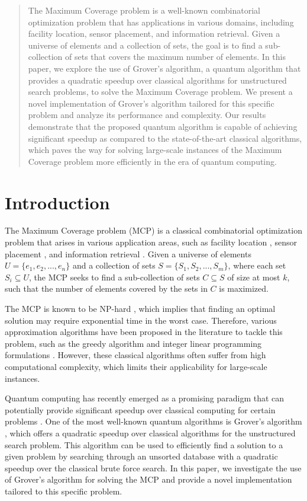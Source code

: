 \begin{abstract}
The Maximum Coverage problem is a well-known combinatorial optimization problem that has applications in various domains, including facility location, sensor placement, and information retrieval. Given a universe of elements and a collection of sets, the goal is to find a sub-collection of sets that covers the maximum number of elements. In this paper, we explore the use of Grover's algorithm, a quantum algorithm that provides a quadratic speedup over classical algorithms for unstructured search problems, to solve the Maximum Coverage problem. We present a novel implementation of Grover's algorithm tailored for this specific problem and analyze its performance and complexity. Our results demonstrate that the proposed quantum algorithm is capable of achieving significant speedup as compared to the state-of-the-art classical algorithms, which paves the way for solving large-scale instances of the Maximum Coverage problem more efficiently in the era of quantum computing.
\end{abstract}

\section{Introduction}

The Maximum Coverage problem (MCP) is a classical combinatorial optimization problem that arises in various application areas, such as facility location \cite{facility_location}, sensor placement \cite{sensor_placement}, and information retrieval \cite{information_retrieval}. Given a universe of elements $U = \{e_1, e_2, ..., e_n\}$ and a collection of sets $S = \{S_1, S_2, ..., S_m\}$, where each set $S_i \subseteq U$, the MCP seeks to find a sub-collection of sets $C \subseteq S$ of size at most $k$, such that the number of elements covered by the sets in $C$ is maximized.

The MCP is known to be NP-hard \cite{NP_hardness}, which implies that finding an optimal solution may require exponential time in the worst case. Therefore, various approximation algorithms have been proposed in the literature to tackle this problem, such as the greedy algorithm \cite{greedy_algorithm} and integer linear programming formulations \cite{integer_programming}. However, these classical algorithms often suffer from high computational complexity, which limits their applicability for large-scale instances.

Quantum computing has recently emerged as a promising paradigm that can potentially provide significant speedup over classical computing for certain problems \cite{quantum_computing}. One of the most well-known quantum algorithms is Grover's algorithm \cite{grover1996}, which offers a quadratic speedup over classical algorithms for the unstructured search problem. This algorithm can be used to efficiently find a solution to a given problem by searching through an unsorted database with a quadratic speedup over the classical brute force search. In this paper, we investigate the use of Grover's algorithm for solving the MCP and provide a novel implementation tailored to this specific problem.

